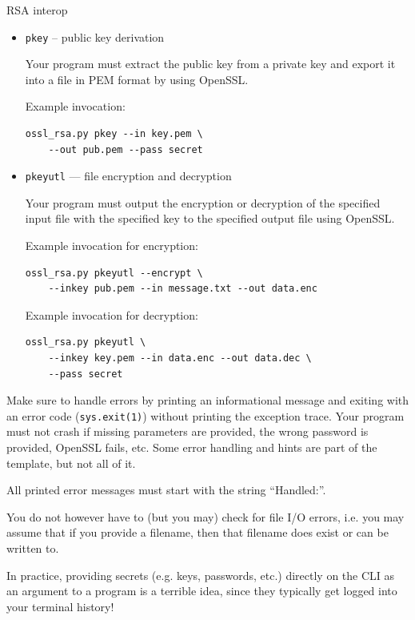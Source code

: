 \documentclass{homework}
\begin{document}
\begin{task}{RSA interop}
\begin{itemize}
    Example invocation:
    \begin{Verbatim}
ossl_rsa.py genpkey --out key.pem --pass secret
    \end{Verbatim}

    \item \texttt{pkey} -- public key derivation
    
    Your program must extract the public key from a private key and export it into a file in PEM format by using OpenSSL.

    Example invocation:
    \begin{Verbatim}
ossl_rsa.py pkey --in key.pem \
    --out pub.pem --pass secret
    \end{Verbatim}

    \item \texttt{pkeyutl} --- file encryption and decryption
    
    Your program must output the encryption or decryption of the specified input file with the specified key to the specified output file using OpenSSL.

    Example invocation for encryption:
    \begin{Verbatim}
ossl_rsa.py pkeyutl --encrypt \
    --inkey pub.pem --in message.txt --out data.enc
    \end{Verbatim}

    Example invocation for decryption:
    \begin{Verbatim}
ossl_rsa.py pkeyutl \
    --inkey key.pem --in data.enc --out data.dec \
    --pass secret
    \end{Verbatim}
  \end{itemize}

  Make sure to handle errors by printing an informational message and exiting with an error code (\texttt{sys.exit(1)}) without printing the exception trace.
  Your program must not crash if missing parameters are provided, the wrong password is provided, OpenSSL fails, etc.
  Some error handling and hints are part of the template, but not all of it.

  All printed error messages must start with the string \enquote{Handled:}.

  You do not however have to (but you may) check for file I/O errors, i.e. you may assume that if you provide a filename, then that filename does exist or can be written to.

  \begin{tcolorbox}[title=Reminder]
    In practice, providing secrets (e.g. keys, passwords, etc.) directly on the CLI as an argument to a program is a terrible idea, since they typically get logged into your terminal history!
  \end{tcolorbox}
\end{task}
\end{document}
